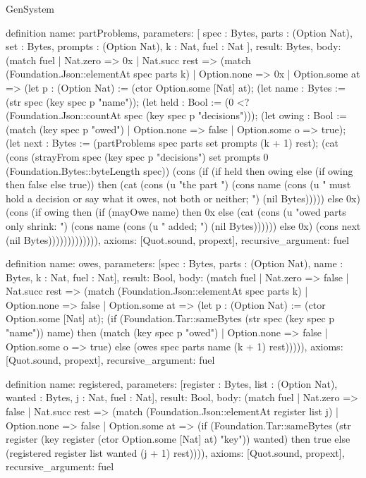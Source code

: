 \begin{lexlean}{GenSystem}
\begin{semanticmodule}
{definition{
  name: partProblems,
  parameters: [
    spec : Bytes,
    parts : (Option Nat),
    set : Bytes,
    prompts : (Option Nat),
    k : Nat,
    fuel : Nat
  ],
  result: Bytes,
  body: (match fuel
    | Nat.zero => 0x
    | Nat.succ rest => (match (Foundation.Json::elementAt spec parts k)
      | Option.none => 0x
      | Option.some at => (let p : (Option Nat) := (ctor Option.some [Nat] at); (let name : Bytes := (str spec (key spec p "name")); (let held : Bool := (0 <? (Foundation.Json::countAt spec (key spec p "decisions"))); (let owing : Bool := (match (key spec p "owed")
        | Option.none => false
        | Option.some o => true); (let next : Bytes := (partProblems spec parts set prompts (k + 1) rest); (cat (cons (strayFrom spec (key spec p "decisions") set prompts 0 (Foundation.Bytes::byteLength spec)) (cons (if (if held then owing else (if owing then false else true)) then (cat (cons (u "the part ") (cons name (cons (u " must hold a decision or say what it owes, not both or neither; ") (nil Bytes))))) else 0x) (cons (if owing then (if (mayOwe name) then 0x else (cat (cons (u "owed parts only shrink: ") (cons name (cons (u " added; ") (nil Bytes)))))) else 0x) (cons next (nil Bytes))))))))))))),
  axioms: [Quot.sound, propext],
  recursive_argument: fuel
}

definition{
  name: owes,
  parameters: [spec : Bytes, parts : (Option Nat), name : Bytes, k : Nat, fuel : Nat],
  result: Bool,
  body: (match fuel
    | Nat.zero => false
    | Nat.succ rest => (match (Foundation.Json::elementAt spec parts k)
      | Option.none => false
      | Option.some at => (let p : (Option Nat) := (ctor Option.some [Nat] at); (if (Foundation.Tar::sameBytes (str spec (key spec p "name")) name) then (match (key spec p "owed")
        | Option.none => false
        | Option.some o => true) else (owes spec parts name (k + 1) rest))))),
  axioms: [Quot.sound, propext],
  recursive_argument: fuel
}

definition{
  name: registered,
  parameters: [register : Bytes, list : (Option Nat), wanted : Bytes, j : Nat, fuel : Nat],
  result: Bool,
  body: (match fuel
    | Nat.zero => false
    | Nat.succ rest => (match (Foundation.Json::elementAt register list j)
      | Option.none => false
      | Option.some at => (if (Foundation.Tar::sameBytes (str register (key register (ctor Option.some [Nat] at) "key")) wanted) then true else (registered register list wanted (j + 1) rest)))),
  axioms: [Quot.sound, propext],
  recursive_argument: fuel
}

}
\end{semanticmodule}
\end{lexlean}
